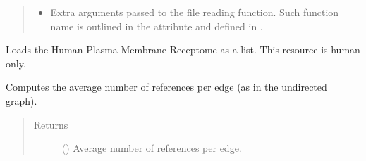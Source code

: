 \documentclass[letterpaper,10pt,english]{sphinxmanual}
\begin{document}
\begin{fulllineitems}
\begin{fulllineitems}
\begin{quote}
\begin{description}
\begin{itemize}
\item {} 
 \textendash{} 
Extra arguments passed to the file reading function. Such
function name is outlined in the
 attribute and
defined in .


\end{itemize}

\end{description}\end{quote}

\end{fulllineitems}


\begin{fulllineitems}
\label{\detokenize{main:pypath.main.PyPath.receptors_list}}
Loads the Human Plasma Membrane Receptome as a list. This
resource is human only.

\end{fulllineitems}


\begin{fulllineitems}
\label{\detokenize{main:pypath.main.PyPath.reference_edge_ratio}}
Computes the average number of references per edge (as in the
undirected graph).
\begin{quote}\begin{description}
\item[{Returns}] \leavevmode
() \textendash{} Average number of references per edge.

\end{description}\end{quote}

\end{fulllineitems}


\begin{fulllineitems}
\label{\detokenize{main:pypath.main.PyPath.reference_hist}}
\end{fulllineitems}


\end{fulllineitems}
\end{document}
